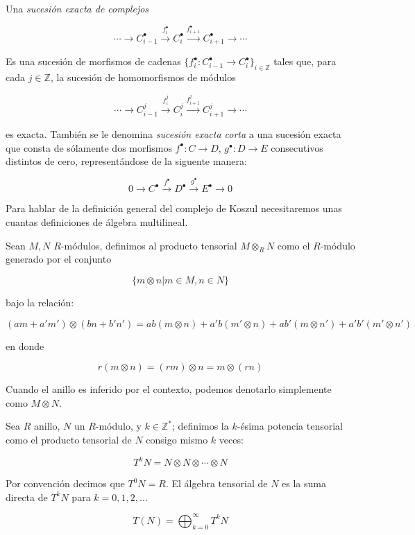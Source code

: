 \begin{definition}

Una \emph{sucesión exacta de complejos}

$$ \cdots \rightarrow C^{\bullet}_{i-1} \xrightarrow{f^{\bullet}_i} C^{\bullet}_i \xrightarrow{f^{\bullet}_{i+1}} C^{\bullet}_{i+1} \rightarrow \cdots$$

Es una sucesión de morfismos de cadenas $\{f^{\bullet}_i:C^{\bullet}_{i-1}\rightarrow C^{\bullet}_i\}_{i \in \mathbb{Z}}$ tales que, para cada $j\in \mathbb{Z}$, la sucesión de homomorfismos de módulos

$$ \cdots \rightarrow C^{j}_{i-1} \xrightarrow{f^j_i} C^{j}_i \xrightarrow{f^j_{i+1}} C^{j}_{i+1} \rightarrow \cdots$$

es exacta. También se le denomina \emph{sucesión exacta corta} a una sucesión exacta que consta de sólamente dos morfismos $f^\bullet:C\rightarrow D$, $g^\bullet:D\rightarrow E$ consecutivos distintos de cero, representándose de la siguente manera:

$$ 0 \rightarrow C^{\bullet} \xrightarrow{f^{\bullet}} D^{\bullet} \xrightarrow{g^{\bullet}} E^{\bullet} \rightarrow 0$$

\end{definition}

Para hablar de la definición general del complejo de Koszul necesitaremos unas cuantas definiciones de álgebra multilineal.

\begin{definition}
Sean $M, N$ $R$-módulos, definimos al producto tensorial $M \otimes_{R} N$ como el $R$-módulo generado por el conjunto 

$$\{m \otimes n | m \in M, n \in N\}$$

bajo la relación:

$$(am + a'm')\otimes(bn + b'n') = ab(m\otimes n) + a'b(m'\otimes n) + ab'(m\otimes n') + a'b'(m'\otimes n')$$

en donde 

$$ r(m \otimes n) = (rm) \otimes n = m \otimes (rn) $$

Cuando el anillo es inferido por el contexto, podemos denotarlo simplemente como $M \otimes N$.
\end{definition}

\begin{definition}
Sea $R$ anillo, $N$ un $R$-módulo, y $k \in \mathbb{Z}^*$; definimos la $k$-ésima potencia tensorial como el producto tensorial de $N$ consigo mismo $k$ veces:

$$ T^kN = N \otimes N \otimes \cdots \otimes N $$

Por convención decimos que $T^0N = R$. El álgebra tensorial de $N$ es la suma directa de $T^kN$ para $k = 0, 1, 2, \dots$

$$ T(N) = \bigoplus_{k=0}^{\infty} T^kN $$
\end{definition}

